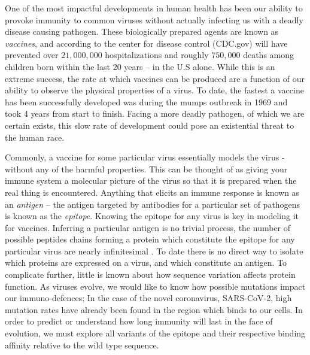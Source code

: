 \documentclass{article}
\begin{document}
One of the most impactful developments in human health has been our ability to provoke immunity to common
viruses without actually infecting us with a deadly disease causing pathogen.
These biologically prepared agents are known as \textit{vaccines}, 
and according to the center for disease control (CDC.gov) will have prevented over $21,000,000$ hospitalizations and roughly $750,000$
deaths among children born within the last $20$ years -- in the U.S alone.
While this is an extreme success, the rate at which vaccines can be produced are a function of our ability to observe the physical properties of a virus.
To date, the fastest a vaccine has been successfully developed was during the mumps outbreak in 1969 and took 4 years from start to finish.
Facing a more deadly pathogen, of which we are certain exists, this slow rate of development could pose an existential threat to the human race.


Commonly, a vaccine for some particular virus essentially models the virus - without any of the harmful properties.
This can be thought of as giving your immune system a molecular picture of the virus so that it is prepared when the real thing is encountered.
Anything that elicits an immune response is known as an \textit{antigen} -- the antigen targeted by antibodies for a particular set of pathogens is known as the \textit{epitope}.
Knowing the epitope for any virus is key in modeling it for vaccines.
Inferring a particular antigen is no trivial process, the number of possible peptides chains forming a protein which constitute the epitope for any particular virus are nearly infinitesimal \citep{Stoddard2020}.
To date there is no direct way to isolate which proteins are expressed on a virus, and which constitute an antigen.
To complicate further, little is known about how sequence variation affects protein function.
As viruses evolve, we would like to know how possible mutations impact our immuno-defences; 
In the case of the novel coronavirus, SARS-CoV-2, high mutation rates have already been found in the region which binds to our cells.
In order to predict or understand how long immunity will last in the face of evolution, we must explore all variants of the epitope
and their respective binding affinity relative to the wild type sequence.
\end{document}
